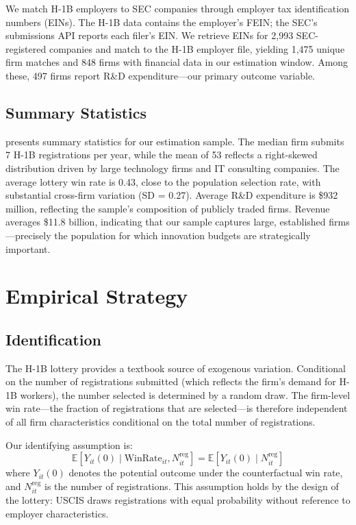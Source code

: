 \documentclass[12pt]{article}
\newcommand{\E}{\mathbb{E}}
\begin{document}
We match H-1B employers to SEC companies through employer tax identification numbers (EINs). The H-1B data contains the employer's FEIN; the SEC's submissions API reports each filer's EIN. We retrieve EINs for 2,993 SEC-registered companies and match to the H-1B employer file, yielding 1,475 unique firm matches and 848 firms with financial data in our estimation window. Among these, 497 firms report R\&D expenditure---our primary outcome variable.

\subsection{Summary Statistics}



 presents summary statistics for our estimation sample. The median firm submits 7 H-1B registrations per year, while the mean of 53 reflects a right-skewed distribution driven by large technology firms and IT consulting companies. The average lottery win rate is 0.43, close to the population selection rate, with substantial cross-firm variation (SD = 0.27). Average R\&D expenditure is \$932 million, reflecting the sample's composition of publicly traded firms. Revenue averages \$11.8 billion, indicating that our sample captures large, established firms---precisely the population for which innovation budgets are strategically important.

\section{Empirical Strategy}
\label{sec:strategy}

\subsection{Identification}

The H-1B lottery provides a textbook source of exogenous variation. Conditional on the number of registrations submitted (which reflects the firm's demand for H-1B workers), the number selected is determined by a random draw. The firm-level win rate---the fraction of registrations that are selected---is therefore independent of all firm characteristics conditional on the total number of registrations.

Our identifying assumption is:
\begin{equation}
\E[Y_{it}(0) \mid \text{WinRate}_{it}, N_{it}^{\text{reg}}] = \E[Y_{it}(0) \mid N_{it}^{\text{reg}}]
\end{equation}
where $Y_{it}(0)$ denotes the potential outcome under the counterfactual win rate, and $N_{it}^{\text{reg}}$ is the number of registrations. This assumption holds by the design of the lottery: USCIS draws registrations with equal probability without reference to employer characteristics.
\end{document}
